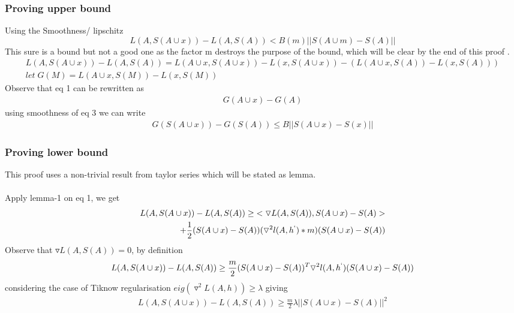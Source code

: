 \documentclass[12pt]{article}
\begin{document}
\subsubsection{Proving upper bound}
\indent Using the Smoothness/ lipschitz
\[L(A,S(A \cup x)) - L(A,S(A)) < B(m) ||S(A \cup m)- S(A)||\]
This sure is a bound but not a good one as the factor m destroys the purpose of the bound, which will be clear by the end of this proof .
\begin{gather}
    L(A,S(A \cup x)) - L(A,S(A)) = L(A \cup x, S(A \cup x)) - L(x, S(A \cup x)) - (L(A \cup x,S(A)) - L(x,S(A))) \\
    let \; G(M) = L(A \cup x, S(M))-L(x,S(M))
\end{gather}
Observe that eq 1 can be rewritten as 
\begin{gather}
    G(A\cup x)-G(A)
\end{gather}
using smoothness of eq 3 we can write
\begin{gather}
    G(S(A \cup x)) - G(S(A)) \leq B || S(A \cup x)- S(x) ||
\end{gather}

\subsubsection{Proving lower bound}
\indent This proof uses a non-trivial result from taylor series which will be stated as lemma.\\[7pt]
\noindent{}
\\[9pt]
Apply lemma-1 on eq 1, we get 
\begin{gather}
\begin{split}
    L(A,S(A \cup x))- L(A,S(A)) \geq \; < \triangledown L(A,S(A)), S(A\cup x)- S(A) > \\+ \frac{1}{2}(S(A\cup x)-S(A))(\triangledown^2 l(A,h^{`})*m)(S(A \cup x)-S(A))
\end{split}
\end{gather}
Observe that $\triangledown L(A,S(A))=0$, by definition
\begin{gather}
    L(A,S(A \cup x))-L(A,S(A)) \geq \frac{m}{2} (S(A \cup x)-S(A))^{T} \triangledown^2 l(A,h^{`})(S(A \cup x)-S(A))
\end{gather}
considering the case of Tiknow regularisation $eig(\triangledown^2 L(A,h)) \geq \lambda$ giving \begin{gather}
    L(A,S(A \cup x)) - L(A,S(A)) \geq \frac{m}{2} \lambda || S(A \cup x) - S(A) ||^2
\end{gather}
\end{document}
